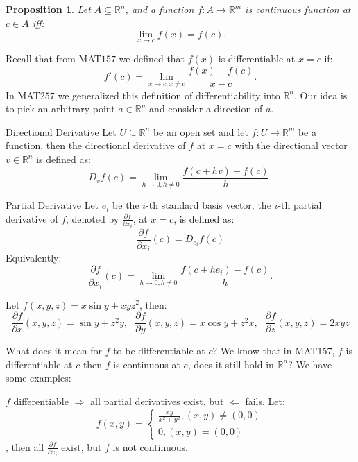 \documentclass[11pt]{article}
\makeatletter
\newcounter{thmcounter}
\newenvironment{definition}[1]{\begin{defbox}{#1}{}}{\end{defbox}}
\newenvironment{example}[1]{\begin{exbox}{#1}{}}{\end{exbox}}
\theoremstyle{quiet}
\newtheorem{proposition}[thmcounter]{Proposition}
\newtheorem{proposition}[tcb@cnt@defbox]{Proposition}
\theoremstyle{quietremark}
\makeatother
\begin{document}
\begin{proposition}
Let $A\subseteq\mathbb{R}^n$, and a function $f:A\to\mathbb{R}^m$ is continuous function at $c\in A$ iff:
\[
\lim_{x\to c}f(x)=f(c).
\]
\end{proposition}

Recall that from MAT$157$ we defined that $f(x)$ is differentiable at $x=c$ if:
\[
f'(c)=\lim_{x\to c,x\ne c}\frac{f(x)-f(c)}{x-c}.
\]
In MAT$257$ we generalized this definition of differentiability into $\mathbb{R}^n$. Our idea is to pick an arbitrary point $a\in\mathbb{R}^n$ and consider a direction of $a$.

\begin{definition}{Directional Derivative}
Let $U\subseteq\mathbb{R}^n$ be an open set and let $f:U\to\mathbb{R}^m$ be a function, then the directional derivative of $f$ at $x=c$ with the directional vector $v\in\mathbb{R}^n$ is defined as:
\[
D_vf(c)=\lim_{h\to 0,h\ne 0}\frac{f(c+hv)-f(c)}{h}.
\]
\end{definition}

\begin{definition}{Partial Derivative}
Let $e_i$ be the $i$-th standard basis vector, the $i$-th partial derivative of $f$, denoted by $\frac{\partial f}{\partial x_i}$, at $x=c$, is defined as:
\[
\frac{\partial f}{\partial x_i}(c)=D_{e_i}f(c)
\]
Equivalently:
\[
\frac{\partial f}{\partial x_i}(c)=\lim_{h\to 0,h\ne 0}\frac{f(c+he_i)-f(c)}{h}.
\]
\end{definition}

\begin{example}{}
Let $f(x,y,z)=x\sin y+xyz^2$, then:
\[
\frac{\partial f}{\partial x}(x,y,z)=\sin y+z^2y,\text{ }
\frac{\partial f}{\partial y}(x,y,z)=x\cos y+z^2x,\text{ }
\frac{\partial f}{\partial z}(x,y,z)=2xyz
\]
\end{example}

What does it mean for $f$ to be differentiable at $c$? We know that in MAT157, $f$ is differentiable at $c$ then $f$ is continuous at $c$, does it still hold in $\mathbb{R}^n$? We have some examples:
\begin{example}{}
$f$ differentiable $\Rightarrow$ all partial derivatives exist, but $\Leftarrow$ fails. 
Let:
\[
f(x,y)=\begin{cases}\frac{xy}{x^2+y^2}, (x,y)\ne (0,0)\\0,(x,y)=(0,0)\end{cases}
\],
then all $\frac{\partial f}{\partial x_i}$ exist, but $f$ is not continuous.
\end{example}
\end{document}
